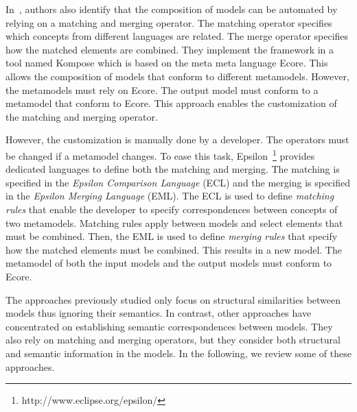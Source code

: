 In~\cite{kompose}, authors also identify that the composition of models can be automated by relying on a matching and merging operator. The matching operator specifies which concepts from different languages are related. The merge operator specifies how the matched elements are combined. They implement the framework in a tool named Kompose which is based on the meta meta language Ecore. This allows the composition of models that conform to different metamodels. However, the metamodels must rely on Ecore. The output model must conform to a metamodel that conform to Ecore. This approach enables the customization of the matching and merging operator. 

However, the customization is manually done by a developer. The operators must be changed if a metamodel changes. To ease this task, Epsilon~\cite{epsilon}\footnote{http://www.eclipse.org/epsilon/} provides dedicated languages to define both the matching and merging. The matching is specified in the \emph{Epsilon Comparison Language} (ECL) and the merging is specified in the \emph{Epsilon Merging Language} (EML). The ECL is used to define \emph{matching rules} that enable the developer to specify correspondences between concepts of two metamodels. Matching rules apply between models and select elements that must be combined. Then, the EML is used to define \emph{merging rules} that specify how the matched elements must be combined. This results in a new model. The metamodel of both the input models and the output models must conform to Ecore.


The approaches previously studied only focus on structural similarities between models thus ignoring their semantics. In contrast, other approaches have concentrated on establishing semantic correspondences between models. They also rely on matching and merging operators, but they consider both structural and semantic information in the models. In the following, we review some of these approaches.  

